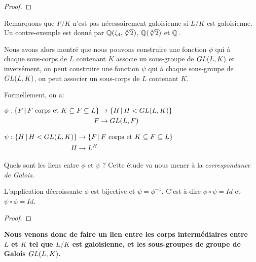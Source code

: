 \ifdefined\outputproof
\begin{proof}

\end{proof}
\fi

Remarquons que $F/K$ n'est pas nécessairement galoisienne si $L/K$ est
galoisienne. Un contre-exemple est donné par $\mathbb{Q}(\zeta_{4},
\sqrt[4]{2})$, $\mathbb{Q}(\sqrt[4]{2})$ et $\mathbb{Q}$.

Nous avons alors montré que nous pouvons construire une fonction $\phi$ qui à
chaque sous-corps de $L$ contenant $K$ associe un sous-groupe de
$GL(L, K)$ et inversément, on peut construire une fonction $\psi$ qui
à chaque sous-groupe de $GL(L, K)$, on peut associer un sous-corps de
$L$ contenant $K$.

Formellement, on a:

\begin{center}
	$
	\begin{aligned}
		\phi :
			\left\{F \, | \, F \text{ corps et } K \subseteq F \subseteq L \right\}
			&\rightarrow \left\{H \, | \, H < GL(L, K) \right\}
			\\
			F &\rightarrow GL(L, F)
	\end{aligned}
	$

	$
	\begin{aligned}
		\psi :
			\left\{H \, | \, H < GL(L, K) \right\}
			&\rightarrow
			\left\{F \, | \, F \text{ corps et } K \subseteq F \subseteq L \right\}
			\\
			H &\rightarrow L^{H}
	\end{aligned}
	$
\end{center}

Quels sont les liens entre $\phi$ et $\psi$ ?
Cette étude va nous mener à la \textit{correspondance de Galois}.

\begin{theorem}
	\label{theorem:galois_correspondance}
	L'application décroissante $\phi$ est bijective et $\psi = \phi^{-1}$.
	C'est-à-dire $\phi \circ \psi = Id$ et $\psi \circ \phi = Id$.
\end{theorem}

\ifdefined\outputproof
\begin{proof}

\end{proof}
\fi

\textbf{Nous venons donc de faire un lien entre les corps intermédiaires entre $L$ et
$K$ tel que $L/K$ est galoisienne, et les sous-groupes de groupe de Galois
$GL(L, K)$.}


